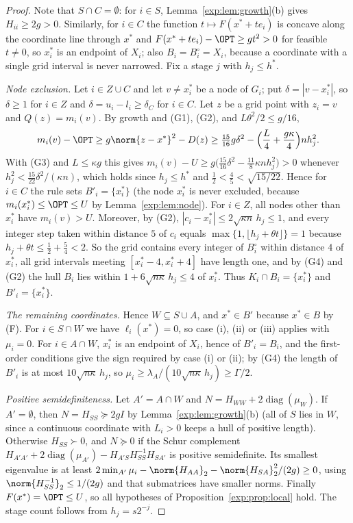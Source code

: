 \begin{proof}
Note that $S\cap C=\emptyset$: for $i\in S$, Lemma~\ref{exp:lem:growth}(b)
gives $H_{ii}\ge2g>0$. Similarly, for $i\in C$ the function
$t\mapsto F(x^*+te_i)$ is concave along the coordinate line through $x^*$
and $F(x^*+te_i)-\OPT\ge gt^2>0$ for feasible $t\ne0$, so $x^*_i$ is an
endpoint of $X_i$; also $B_i=B^\circ_i=X_i$, because a coordinate with a
single grid interval is never narrowed. Fix a stage $j$ with $h_j\le h^*$.

\emph{Node exclusion.} Let $i\in Z\cup C$ and let $v\ne x^*_i$ be a node of
$G_i$; put $\delta=|v-x^*_i|$, so $\delta\ge1$ for $i\in Z$ and
$\delta=u_i-l_i\ge\delta_C$ for $i\in C$. Let $z$ be a grid point with
$z_i=v$ and $Q(z)=m_i(v)$. By growth and (G1), (G2), and
$L\theta^2/2\le g/16$,
\[
m_i(v)-\OPT\ge g\norm{z-x^*}^2-D(z)\ge\tfrac{15}{16}g\delta^2
-\Bigl(\frac L4+\frac{g\kappa}4\Bigr)nh_j^2 .
\]
With (G3) and $L\le\kappa g$ this gives
$m_i(v)-U\ge g\bigl(\frac{15}{16}\delta^2-\frac{11}8\kappa nh_j^2\bigr)>0$
whenever $h_j^2<\frac{15}{22}\delta^2/(\kappa n)$, which holds since
$h_j\le h^*$ and $\frac12<\frac45<\sqrt{15/22}$. Hence for $i\in C$
the rule sets $B'_i=\{x^*_i\}$ (the node $x^*_i$ is never excluded, because
$m_i(x^*_i)\le\OPT\le U$ by Lemma~\ref{exp:lem:node}). For $i\in Z$, all
nodes other than $x^*_i$ have $m_i(v)>U$. Moreover, by (G2),
$|c_i-x^*_i|\le2\sqrt{\kappa n}\,h_j\le1$, and every
integer step taken within distance $5$ of $c_i$ equals
$\max\{1,\lfloor h_j+\theta t\rfloor\}=1$ because
$h_j+\theta t\le\frac12+\frac54<2$. So the grid contains every integer of
$B^\circ_i$ within distance $4$ of $x^*_i$, all grid intervals meeting
$[x^*_i-4,x^*_i+4]$ have length one, and by (G4) and (G2) the hull $B_i$
lies within $1+6\sqrt{n\kappa}\,h_j\le4$ of $x^*_i$. Thus $K_i\cap B_i=\{x^*_i\}$
and $B'_i=\{x^*_i\}$.

\emph{The remaining coordinates.} Hence $W\subseteq S\cup A$, and
$x^*\in B'$ because $x^*\in B$ by (F). For $i\in S\cap W$ we have
$\ell_i(x^*)=0$, so case (i), (ii) or (iii) applies with $\mu_i=0$. For
$i\in A\cap W$, $x^*_i$ is an endpoint of $X_i$, hence of $B'_i=B_i$, and
the first-order conditions give the sign required by case (i) or (ii); by
(G4) the length of $B'_i$ is at most $10\sqrt{n\kappa}\,h_j$, so
$\mu_i\ge\lambda_A/(10\sqrt{n\kappa}\,h_j)\ge\Gamma/2$.

\emph{Positive semidefiniteness.} Let $A'=A\cap W$ and
$N=H_{WW}+2\operatorname{diag}(\mu_W)$. If $A'=\emptyset$, then
$N=H_{SS}\succeq2gI$ by Lemma~\ref{exp:lem:growth}(b) (all of $S$ lies in
$W$, since a continuous coordinate with $L_i>0$ keeps a hull of positive
length). Otherwise $H_{SS}\succ0$, and $N\succeq0$ if the Schur complement
$H_{A'A'}+2\operatorname{diag}(\mu_{A'})-H_{A'S}H_{SS}^{-1}H_{SA'}$ is
positive semidefinite. Its smallest eigenvalue is at least
$2\min_{A'}\mu_i-\norm{H_{AA}}_2-\norm{H_{SA}}_2^2/(2g)\ge0$, using
$\norm{H_{SS}^{-1}}_2\le1/(2g)$ and that submatrices have smaller norms.
Finally $F(x^*)=\OPT\le U$, so all hypotheses of
Proposition~\ref{exp:prop:local} hold. The stage count follows from
$h_j=s2^{-j}$.
\end{proof}

